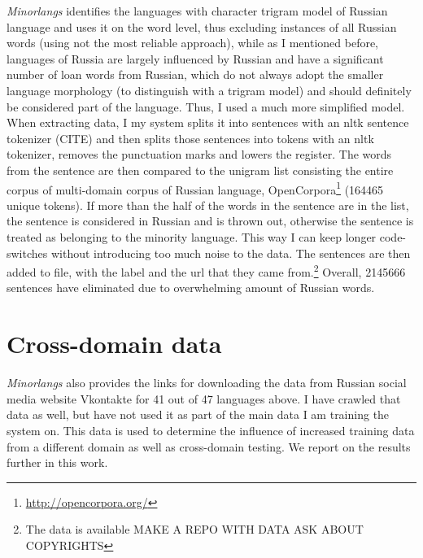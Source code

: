 \textit{Minorlangs} identifies the languages with character trigram model of Russian language and uses it on the word level, thus excluding instances of all Russian words (using not the most reliable approach), while as I mentioned before, languages of Russia are largely influenced by Russian and have a significant number of loan words from Russian, which do not always adopt the smaller language morphology (to distinguish with a trigram model) and should definitely be considered part of the language. Thus, I used a much more simplified model. When extracting data, I my system splits it into sentences with an nltk sentence tokenizer (CITE) and then splits those sentences into tokens with an nltk tokenizer, removes the punctuation marks and lowers the register. The words from the sentence are then compared to the unigram list consisting the entire corpus of multi-domain corpus of Russian language,  OpenCorpora\footnote{\url{http://opencorpora.org/}} (164465 unique tokens). If more than the half of the words in the sentence are in the list, the sentence is considered in Russian and is thrown out, otherwise the sentence is treated as belonging to the minority language. This way I can keep longer code-switches without introducing too much noise to the data. The sentences are then added to file, with the label and the url that they came from.\footnote{The data is available MAKE A REPO WITH DATA ASK ABOUT COPYRIGHTS}
Overall, 2145666 sentences have eliminated due to overwhelming amount of Russian words.

\section{Cross-domain data}

\textit{Minorlangs} also provides the links for downloading the data from Russian social media website Vkontakte for 41 out of 47 languages above. I have crawled that data as well, but have not used it as part of the main data I am training the system on. This data is used to determine the influence of increased training data from a different domain as well as cross-domain testing. We report on the results further in this work.  

